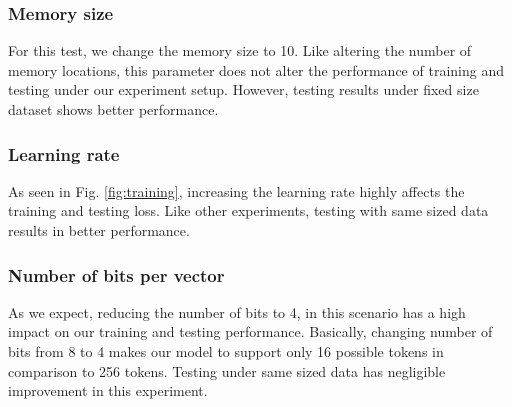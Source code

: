 \documentclass[acmsmall]{acmart}
\begin{document}
\subsubsection{Memory size}
For this test, we change the memory size to 10. Like altering the number of memory locations, this parameter does not alter the performance of training and testing under our experiment setup. However, testing results under fixed size dataset shows better performance.

\subsubsection{Learning rate}
As seen in Fig. \ref{fig:training}, increasing the learning rate highly affects the training and testing loss. Like other experiments, testing with same sized data results in better performance.

\subsubsection{Number of bits per vector}
As we expect, reducing the number of bits to 4, in this scenario has a high impact on our training and testing performance. Basically, changing number of bits from 8 to 4 makes our model to support only 16 possible tokens in comparison to 256 tokens. Testing under same sized data has negligible improvement in this experiment.
\end{document}
